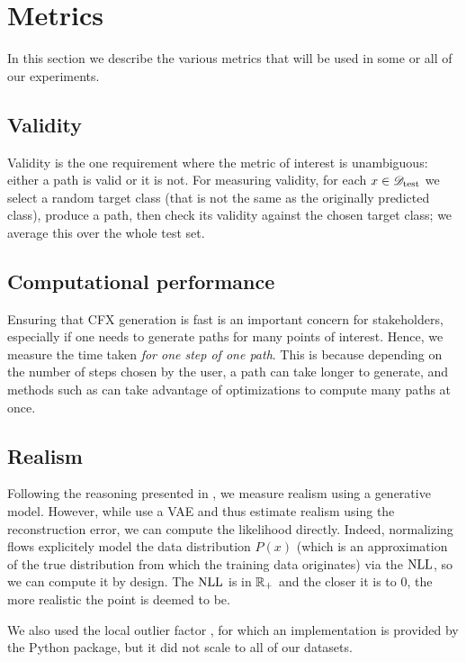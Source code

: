 \documentclass[../main.tex]{subfiles}
\begin{document}
\section{Metrics}

In this section we describe the various metrics that will be used in some or all of our experiments.

\subsection{Validity}

Validity is the one requirement where the metric of interest is unambiguous: either a path is valid or it is not.
For measuring validity, for each $x \in \mathscr{D}_\text{test}$ we select a random target class (that is not the same as the originally
predicted class), produce a path, then check its validity against the chosen target class; we average this over the whole
test set.

\subsection{Computational performance}

Ensuring that CFX generation is fast is an important concern for stakeholders, especially if one needs to generate paths for many points of interest.
Hence, we measure the time taken \emph{for one step of one path}.
This is because depending on the number of steps chosen by the user, a path can take longer to generate, and methods such as \ls{} can take advantage of optimizations to compute many paths at once.

\subsection{Realism}

Following the reasoning presented in \cite{vanlooverenInterpretable2021}, we measure realism using a generative model.
However, while \citeauthor{vanlooverenInterpretable2021} use a VAE and thus estimate realism using the reconstruction error, we can compute the likelihood directly.
Indeed, normalizing flows explicitely model the data distribution $P(x)$ (which is an approximation of the true distribution from which the training data originates)
via the $\text{NLL}$, so we can compute it by design.
The $\text{NLL}$ is in $\mathbb{R}_+$ and the closer it is to 0, the more realistic the point is deemed to be.

We also used the local outlier factor \cite{breunigLOF2000}, for which an implementation is provided by the \sklearn{} Python package, but it did not scale to all of our datasets.
\end{document}
